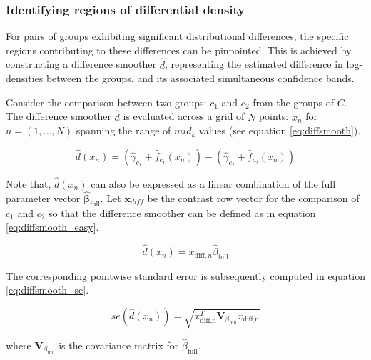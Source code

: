 
\subsubsection{Identifying regions of differential density}
For pairs of groups exhibiting significant distributional differences, the specific regions contributing to these differences can be pinpointed. This is achieved by constructing a difference smoother $\hat{d}$, representing the estimated difference in log-densities between the groups, and its associated simultaneous confidence bands.

Consider the comparison between two groups: $c_1$ and $c_2$ from the groups of $C$. The difference smoother $\hat{d}$ is evaluated across a grid of $N$ points: $x_n$ for $n = (1,...,N)$ spanning the range of $mid_k$ values (see equation \ref{eq:diffsmooth}).

\begin{equation}
\hat{d}(x_n) = (\hat{\gamma}_{c_1} + \hat{f}_{c_1}(x_n)) - (\hat{\gamma}_{c_2} + \hat{f}_{c_2}(x_n))
\label{eq:diffsmooth}
\end{equation}

Note that, $\hat{d}(x_n)$ can also be expressed as a linear combination of the full parameter vector $\hat{\boldsymbol{\beta}}_{\text{full}}$. Let $\boldsymbol{x}_{diff}$ be the contrast row vector for the comparison of $c_1$ and $c_2$ so that the difference smoother can be defined as in equation \ref{eq:diffsmooth_easy}.

\begin{equation}
\hat{d}(x_n) = x_{\text{diff},n}\hat{\beta}_{\text{full}}
\label{eq:diffsmooth_easy}
\end{equation}

The corresponding pointwise standard error is subsequently computed in equation \ref{eq:diffsmooth_se}.

\begin{equation}
se(\hat{d}(x_n)) = \sqrt{x_{\text{diff,n}}^T\boldsymbol{V}_{\beta_{\text{full}}}x_{\text{diff,n}}}
\label{eq:diffsmooth_se}
\end{equation}

where $\boldsymbol{V}_{\beta_{\text{full}}}$ is the covariance matrix for $\hat{\beta}_{\text{full}}$.

